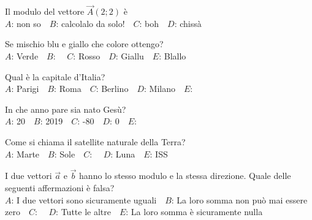\mcquestionfooter



\def\mcquestionnumber{7}


\mcquestionheader Il modulo del vettore $\vec{A}(2;2)$ è\\
{$A$}: non so\ \ {$B$}: calcolalo da solo!\ \ {$C$}: boh\ \ {$D$}: chissà\ \ 

\mcquestionfooter



\def\mcquestionnumber{8}


\mcquestionheader Se mischio blu e giallo che colore ottengo?\\
{$A$}: Verde\ \ {$B$}: \ \ {$C$}: Rosso\ \ {$D$}: Giallu\ \ {$E$}: Blallo\ \ 

\mcquestionfooter



\def\mcquestionnumber{9}


\mcquestionheader Qual è la capitale d’Italia?\\
{$A$}: Parigi\ \ {$B$}: Roma\ \ {$C$}: Berlino\ \ {$D$}: Milano\ \ {$E$}: \ \ 

\mcquestionfooter



\def\mcquestionnumber{10}


\mcquestionheader In che anno pare sia nato Gesù?\\
{$A$}: 20\ \ {$B$}: 2019\ \ {$C$}: -80\ \ {$D$}: 0\ \ {$E$}: \ \ 

\mcquestionfooter



\def\mcquestionnumber{11}


\mcquestionheader Come si chiama il satellite naturale della Terra?\\
{$A$}: Marte\ \ {$B$}: Sole\ \ {$C$}: \ \ {$D$}: Luna\ \ {$E$}: ISS\ \ 

\mcquestionfooter



\def\mcquestionnumber{12}


\mcquestionheader I due vettori $\vec{a}$ e $\vec{b}$ hanno lo stesso modulo e la stessa direzione. Quale delle seguenti affermazioni è falsa?\\
{$A$}: I due vettori sono sicuramente uguali\ \ {$B$}: La loro somma non può mai essere zero\ \ {$C$}: \ \ {$D$}: Tutte le altre\ \ {$E$}: La loro somma è sicuramente nulla\ \ 

\mcquestionfooter



\mcpaperfooter

